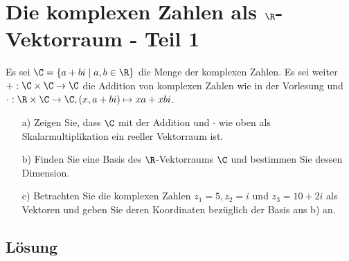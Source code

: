 %
\section{Die komplexen Zahlen als $\R$-Vektorraum - Teil 1}
Es sei $\C=\{a+bi \mid a,b \in \R\}$ die Menge der komplexen Zahlen. Es sei weiter \\ $+: \C \times \C \to \C$ die Addition von komplexen Zahlen wie in der Vorlesung und \\$\cdot: \R \times \C \to \C, (x,a+bi) \mapsto xa+xbi$.
\begin{itemize}
\item[a)] Zeigen Sie, dass $\C$ mit der Addition und $\cdot$ wie oben als Skalarmultiplikation ein reeller Vektorraum ist.
\item[b)] Finden Sie eine Basis des $\R$-Vektorraums $\C$ und bestimmen Sie dessen Dimension.
\item[c)] Betrachten Sie die komplexen Zahlen $z_1=5, z_2=i$ und $z_3=10+2i$ als Vektoren und geben Sie deren Koordinaten bezüglich der Basis aus b) an.

\end{itemize}


\subsection*{L\"osung}

